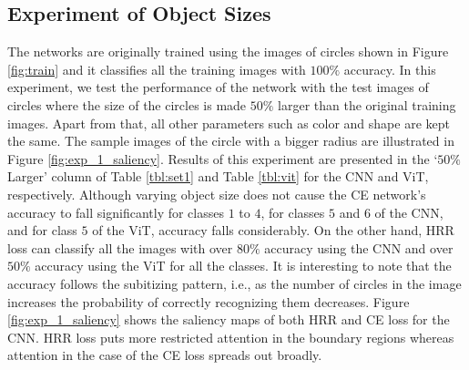 \documentclass[letterpaper]{article} %
\begin{document}
\subsection{Experiment of Object Sizes}
The networks are originally trained using the images of circles shown in Figure \ref{fig:train} and it classifies all the training images with $100\%$ accuracy. In this experiment, we test the performance of the network with the test images of circles where the size of the circles is made $50\%$ larger than the original training images.  Apart from that, all other parameters such as color and shape are kept the same. The sample images of the circle with a bigger radius are illustrated in Figure \ref{fig:exp_1_saliency}. Results of this experiment are presented in the `$50\%$ Larger’ column of Table \ref{tbl:set1} and Table \ref{tbl:vit} for the CNN and ViT, respectively. Although varying object size does not cause the CE network’s accuracy to fall significantly for classes $1$ to $4$, for classes $5$ and $6$ of the CNN, and for class $5$ of the ViT, accuracy falls considerably. On the other hand, HRR loss can classify all the images with over $80\%$ accuracy using the CNN and over $50\%$ accuracy using the ViT for all the classes. It is interesting to note that the accuracy follows the subitizing pattern, i.e., as the number of circles in the image increases the probability of correctly recognizing them decreases. Figure \ref{fig:exp_1_saliency} shows the saliency maps of both HRR and CE loss for the CNN. HRR loss puts more restricted attention in the boundary regions whereas attention in the case of the CE loss spreads out broadly.  
\end{document}
